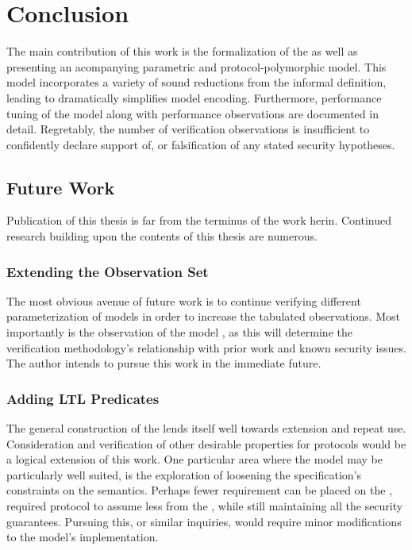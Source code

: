 \hypertarget{conclusion}{%
\chapter{Conclusion}\label{conclusion}}

The main contribution of this work is the formalization of the \CGKAsec as well as presenting an acompanying parametric and protocol-polymorphic  model.
This \CGKAmod{}{}{} model incorporates a variety of sound reductions from the informal \CGKAsec definition, leading to dramatically simplifies model encoding.
Furthermore, performance tuning of the model along with performance observations are documented in detail.
Regretably, the number of verification observations is insufficient to confidently declare support of, or falsification of any stated security hypotheses.


\hypertarget{future-work}{%
\section{Future Work}\label{future-work}}

Publication of this thesis is far from the terminus of the work herin.
Continued research building upon the contents of this thesis are numerous.


\hypertarget{more-observations}{%
\subsection{Extending the Observation Set}\label{more-observations}}

The most obvious avenue of future work is to continue verifying different parameterization of  models in order to increase the tabulated observations.
Most importantly is the observation of the model , as this will determine the verification methodology's relationship with prior work and known security issues.
The author intends to pursue this work in the immediate future.


\hypertarget{more-predicates}{%
\subsection{Adding LTL Predicates}\label{more-predicates}}

The general construction of the  lends itself well towards extension and repeat use.
Consideration and verification of other desirable properties for \CGKAdef protocols would be a logical extension of this work.
One particular area where the  model may be particularly well suited, is the exploration of loosening the  specification's constraints on the  semantics.
Perhaps fewer requirement can be placed on the , required protocol to assume less from the , while still maintaining all the  security guarantees.
Pursuing this, or similar inquiries, would require minor modifications to the  model's implementation.


